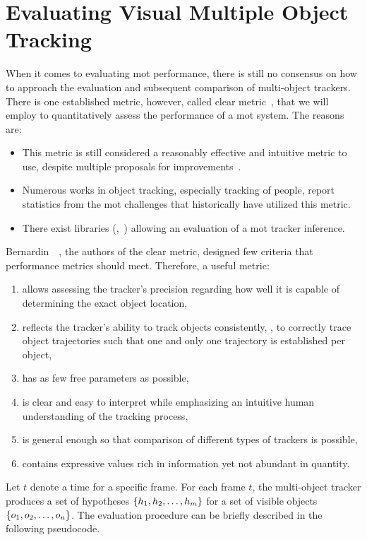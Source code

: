\section{Evaluating Visual Multiple Object Tracking}
\label{sec:EvaluatingMOT}

When it comes to evaluating \gls{mot} performance, there is still no consensus on how to approach the evaluation and subsequent comparison of multi-object trackers. There is one established metric, however, called \gls{clear} metric~\cite{bernardin2008clearmot}, that we will employ to quantitatively assess the performance of a \gls{mot} system. The reasons are:
\begin{itemize}
    \item This metric is still considered a reasonably effective and intuitive metric to use, despite multiple proposals for improvements~\cite{wen2020uadetrac}.
    \item Numerous works in object tracking, especially tracking of people, report statistics from the \gls{mot} challenges that historically have utilized this metric.
    \item There exist libraries (\egtext{},~\cite{webpymotmetrics}) allowing an evaluation of a \gls{mot} tracker inference.
\end{itemize}

Bernardin~\etal{}~\cite{bernardin2008clearmot}, the authors of the \gls{clear} metric, designed few criteria that performance metrics should meet. Therefore, a useful metric:
\begin{enumerate}
    \item allows assessing the tracker's precision regarding how well it is capable of determining the exact object location,
    \item reflects the tracker's ability to track objects consistently, \ietext{}, to correctly trace object trajectories such that one and only one trajectory is established per object,
    \item has as few free parameters as possible,
    \item is clear and easy to interpret while emphasizing an intuitive human understanding of the tracking process,
    \item is general enough so that comparison of different types of trackers is possible,
    \item contains expressive values rich in information yet not abundant in quantity.
\end{enumerate}

Let $t$ denote a time for a specific frame. For each frame $t$, the multi-object tracker produces a set of hypotheses $\left\{ {h_1, h_2, \dots, h_m} \right\}$ for a set of visible objects $\left\{ {o_1, o_2, \dots, o_n} \right\}$. The evaluation procedure can be briefly described in the following pseudocode.

